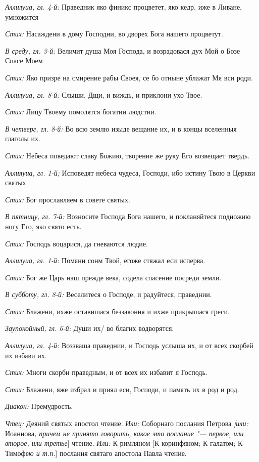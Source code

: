 \begin{mymulticols}
{\itshape Аллилуиа, гл. 4-й:} Праведник яко финикс процветет, яко кедр, иже в Ливане, умножится


{\itshape Стих:} Насаждени в дому Господни, во дворех Бога нашего процветут.


{\itshape В среду, гл. 3-й:} Величит душа Моя Господа, и возрадовася дух Мой о Бозе Спасе Моем


{\itshape Стих:} Яко призре на смирение рабы Своея, се бо отныне ублажат Мя вси роди.


{\itshape Аллилуиа, гл. 8-й:} Слыши, Дщи, и виждь, и приклони ухо Твое.


{\itshape Стих:} Лицу Твоему помолятся богатии людстии.


{\itshape В четверг, гл. 8-й:} Во всю землю изыде вещание их, и в концы вселенныя глаголы их.


{\itshape Стих:} Небеса поведают славу Божию, творение же руку Его возвещает твердь.


{\itshape Аллияуиа, гл. 1-й;} Исповедят небеса чудеса, Господи, ибо истину Твою в Церкви святых


{\itshape Стих:} Бог прославляем в совете святых.


{\itshape В пятницу, гл. 7-й:} Возносите Господа Бога нашего, и покланяйтеся подножию ногу Его, яко свято есть.


{\itshape Стих:} Господь воцарися, да гневаются людие.


{\itshape Аллилуиа, гл. 1-й:} Помяни сонм Твой, егоже стяжал еси исперва.


{\itshape Стих:} Бог же Царь наш прежде века, содела спасение посреди земли. 


{\itshape В субботу, гл. 8-й:} Веселитеся о Господе, и радуйтеся, праведнии.


 {\itshape Стих:} Блажени, ихже оставишася беззакония и ихже прикрышася греси.


 {\itshape Заупокойный, гл. 6-й:} Души их/ во благих водворятся.


 {\itshape Аллилуиа, гл. 4-й:} Воззваша праведнии, и Господь услыша их, и от всех скорбей их избави их.


 {\itshape Стих:} Многи скорби праведным, и от всех их избавит я Господь.


 {\itshape Стих:} Блажени, яже избрал и приял еси, Господи, и память их в род и род.


{\itshape Диакон:} Премудрость.


{\itshape Чтец:} Деяний святых апостол чтение. {\itshape Или:} Соборнаго послания Петрова {\itshape [или:} Иоаннова{\itshape , причем не принято говорить, какое это послание "--- первое, или второе, или третье}] чтение. {\itshape Или:} К римляном [К коринфяном; К галатом; К Тимофе{\itshape ю и т.п.}] послания святаго апостола Павла чтение.


\end{mymulticols}
